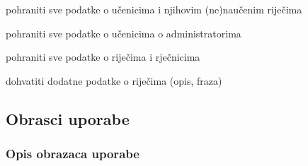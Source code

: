 \begin{packed_enum}
\begin{packed_enum}
	\end{packed_enum}

	\item  {}
	
	\begin{packed_enum}
		
		\item pohraniti sve podatke o učenicima i njihovim (ne)naučenim riječima
		\item pohraniti sve podatke o učenicima o administratorima 
		\item pohraniti sve podatke o riječima i rječnicima
		
	\end{packed_enum}

	\item  {}
	
	\begin{packed_enum}
		
		\item dohvatiti dodatne podatke o riječima (opis, fraza)
		
	\end{packed_enum}

\end{packed_enum}

\eject

\subsection{Obrasci uporabe}

\subsubsection{Opis obrazaca uporabe}

